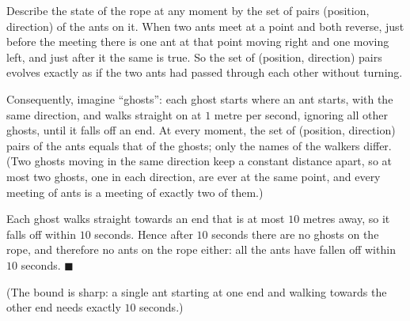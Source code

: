 Describe the state of the rope at any moment by the set of pairs (position, direction) of the ants on it. When two ants meet at a point and both reverse, just before the meeting there is one ant at that point moving right and one moving left, and just after it the same is true. So the set of (position, direction) pairs evolves exactly as if the two ants had passed through each other without turning.

Consequently, imagine ``ghosts'': each ghost starts where an ant starts, with the same direction, and walks straight on at $1$ metre per second, ignoring all other ghosts, until it falls off an end. At every moment, the set of (position, direction) pairs of the ants equals that of the ghosts; only the names of the walkers differ. (Two ghosts moving in the same direction keep a constant distance apart, so at most two ghosts, one in each direction, are ever at the same point, and every meeting of ants is a meeting of exactly two of them.)

Each ghost walks straight towards an end that is at most $10$ metres away, so it falls off within $10$ seconds. Hence after $10$ seconds there are no ghosts on the rope, and therefore no ants on the rope either: all the ants have fallen off within $10$ seconds. $\blacksquare$

(The bound is sharp: a single ant starting at one end and walking towards the other end needs exactly $10$ seconds.)
